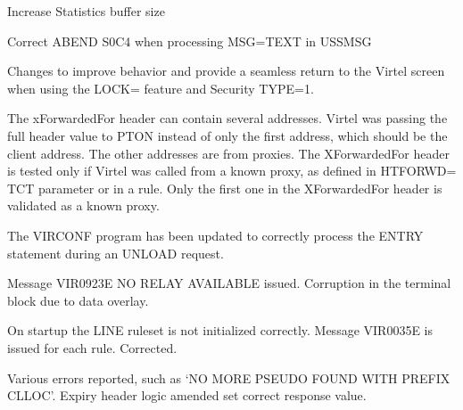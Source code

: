 \documentclass[letterpaper,10pt,english]{sphinxmanual}
\begin{document}
\sphinxAtStartPar
{}

\sphinxAtStartPar
Increase Statistics buffer size

\sphinxAtStartPar
{}

\sphinxAtStartPar
Correct ABEND S0C4 when processing MSG=TEXT in USSMSG

\sphinxAtStartPar
{}

\sphinxAtStartPar
Changes to improve behavior and provide a seamless return to the Virtel screen when using the LOCK= feature and Security TYPE=1.

\sphinxAtStartPar
{}

\sphinxAtStartPar
The x\sphinxhyphen{}Forwarded\sphinxhyphen{}For header can contain several addresses. Virtel was passing the full header value to PTON instead of only the first address, which should be the client address. The other addresses are from proxies. The X\sphinxhyphen{}Forwarded\sphinxhyphen{}For header is tested only if Virtel was called from a known proxy, as defined in HTFORWD= TCT parameter or in a rule. Only the first one in the X\sphinxhyphen{}Forwarded\sphinxhyphen{}For header is validated as a known proxy.

\sphinxAtStartPar
{}

\sphinxAtStartPar
The VIRCONF program has been updated to correctly process the ENTRY statement during an UNLOAD request.

\sphinxAtStartPar
{}

\sphinxAtStartPar
Message VIR0923E NO RELAY AVAILABLE issued. Corruption in the terminal block due to data overlay.

\sphinxAtStartPar
{}

\sphinxAtStartPar
On startup the LINE ruleset is not initialized correctly. Message VIR0035E is issued for each rule. Corrected.

\sphinxAtStartPar
{}

\sphinxAtStartPar
Various errors reported, such as ‘NO MORE PSEUDO FOUND WITH PREFIX CLLOC’. Expiry header logic amended set correct response value.
\end{document}

